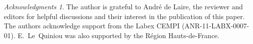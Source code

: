 \documentclass[11pt]{article}
\newcommand{\R}{\mathbb{R}}
\renewcommand{\Re}{\operatorname{Re}}
\theoremstyle{plain}
\theoremstyle{definition}
\newtheorem{lemma}{Lemma}
\theoremstyle{remark}
\newtheorem*{merci}{Acknowledgments}
\numberwithin{equation}{section}
\begin{document}
{		%
		\begin{merci}
			The author is grateful to Andr\'e de Laire, the reviewer and editors for helpful discussions and their interest in the publication of this paper. 
			The authors acknowledge support from the Labex CEMPI (ANR-11-LABX-0007-01). E.~Le~Quiniou was also supported by the R\'egion Hauts-de-France.
		\end{merci}

}
\end{document}
